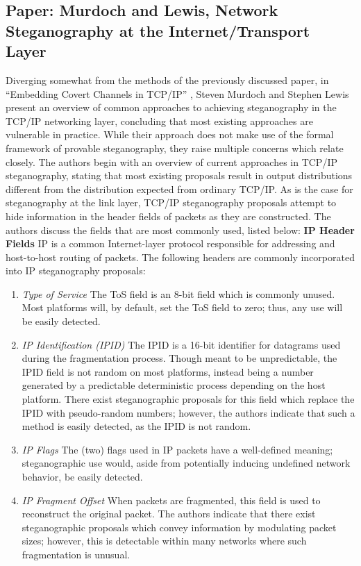\documentclass{article}
\begin{document}
\subsection{Paper: Murdoch and Lewis, Network Steganography at the Internet/Transport Layer}

Diverging somewhat from the methods of the previously discussed paper, in ``Embedding Covert Channels in TCP/IP'' \cite{MurdochLewis}, Steven Murdoch and 
Stephen Lewis present an overview of common approaches to achieving steganography in the TCP/IP networking layer, concluding that most 
existing approaches are vulnerable in practice.  While their approach does not make use of the formal framework of provable steganography, they raise multiple concerns which relate closely.
\newline\newline
The authors begin with an overview of current approaches in TCP/IP steganography, stating that most existing proposals 
result in output distributions different from the distribution expected from ordinary TCP/IP.  As is the case for steganography 
at the link layer, TCP/IP steganography proposals attempt to hide information in the header fields of packets as they are constructed.
The authors discuss the fields that are most commonly used, listed below:
\newline\newline
\noindent \textbf{IP Header Fields }  IP is a common Internet-layer protocol responsible for addressing and host-to-host routing of packets.  The following headers are commonly incorporated into IP steganography proposals:
\begin{enumerate}
\item{\textit{Type of Service } The ToS field is an 8-bit field which is commonly unused.  Most platforms will, by default, 
set the ToS field to zero; thus, any use will be easily detected. }
\item{\textit{IP Identification (IPID) } The IPID is a 16-bit identifier for datagrams used during the fragmentation process.  
Though meant to be unpredictable, the IPID field is not random on most platforms, instead being a number generated by a predictable deterministic process 
depending on the host platform. There exist steganographic proposals for this field which replace the IPID with pseudo-random numbers; 
however, the authors indicate that such a method is easily detected, as the IPID is not random.}
\item{\textit{IP Flags} The (two) flags used in IP packets have a well-defined meaning; steganographic use would, aside from 
potentially inducing undefined network behavior, be easily detected.}
\item{\textit{IP Fragment Offset } When packets are fragmented, this field is used to reconstruct the original packet.  The authors 
indicate that there exist steganographic proposals which convey information by modulating packet sizes; however, this is detectable 
within many networks where such fragmentation is unusual.}
\end{enumerate}
\end{document}
